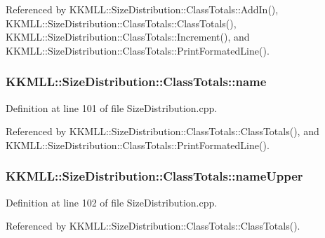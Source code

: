 Referenced by K\+K\+M\+L\+L\+::\+Size\+Distribution\+::\+Class\+Totals\+::\+Add\+In(), K\+K\+M\+L\+L\+::\+Size\+Distribution\+::\+Class\+Totals\+::\+Class\+Totals(), K\+K\+M\+L\+L\+::\+Size\+Distribution\+::\+Class\+Totals\+::\+Increment(), and K\+K\+M\+L\+L\+::\+Size\+Distribution\+::\+Class\+Totals\+::\+Print\+Formated\+Line().

\subsubsection[{\texorpdfstring{name}{name}}]{ K\+K\+M\+L\+L\+::\+Size\+Distribution\+::\+Class\+Totals\+::name}\hypertarget{class_size_distribution_1_1_class_totals_a7653b3388a786c26c3ece3f5f92aabec}{}\label{class_size_distribution_1_1_class_totals_a7653b3388a786c26c3ece3f5f92aabec}


Definition at line 101 of file Size\+Distribution.\+cpp.



Referenced by K\+K\+M\+L\+L\+::\+Size\+Distribution\+::\+Class\+Totals\+::\+Class\+Totals(), and K\+K\+M\+L\+L\+::\+Size\+Distribution\+::\+Class\+Totals\+::\+Print\+Formated\+Line().

\subsubsection[{\texorpdfstring{name\+Upper}{nameUpper}}]{ K\+K\+M\+L\+L\+::\+Size\+Distribution\+::\+Class\+Totals\+::name\+Upper}\hypertarget{class_size_distribution_1_1_class_totals_a1115a9dcf8c7f776eda20e95d27e83fa}{}\label{class_size_distribution_1_1_class_totals_a1115a9dcf8c7f776eda20e95d27e83fa}


Definition at line 102 of file Size\+Distribution.\+cpp.



Referenced by K\+K\+M\+L\+L\+::\+Size\+Distribution\+::\+Class\+Totals\+::\+Class\+Totals().

